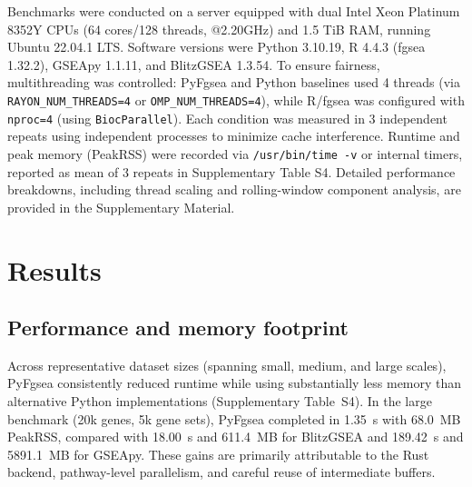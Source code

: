 \documentclass[numsec,webpdf,modern,large,numbered]{oup-authoring-template}
\newcommand{\rev}[1]{\textcolor{revisionred}{#1}}
\begin{document}
Benchmarks were conducted on a server equipped with dual Intel Xeon Platinum 8352Y CPUs (64 cores/128 threads, @2.20GHz) and 1.5 TiB RAM, running Ubuntu 22.04.1 LTS.
Software versions were Python 3.10.19, R 4.4.3 (fgsea 1.32.2), GSEApy 1.1.11, and BlitzGSEA 1.3.54.
To ensure fairness, multithreading was controlled: PyFgsea and Python baselines used 4 threads (via \texttt{RAYON\_NUM\_THREADS=4} or \texttt{OMP\_NUM\_THREADS=4}), while R/fgsea was configured with \texttt{nproc=4} (using \texttt{BiocParallel}).
Each condition was measured in 3 independent repeats using independent processes to minimize cache interference.
Runtime and peak memory (PeakRSS) were recorded via \texttt{/usr/bin/time -v} or internal timers, reported as mean of 3 repeats in Supplementary Table S4.
Detailed performance breakdowns, including thread scaling and rolling-window component analysis, are provided in the Supplementary Material.

\section{Results}
\subsection{Performance and memory footprint}
Across representative dataset sizes (spanning small, medium, and large scales), PyFgsea consistently reduced runtime while using substantially less memory than alternative Python implementations \rev{(Supplementary Table~S4)}.
{\color{revisionred}In the large benchmark (20k genes, 5k gene sets), PyFgsea completed in 1.35~s with 68.0~MB PeakRSS, compared with 18.00~s and 611.4~MB for BlitzGSEA and 189.42~s and 5891.1~MB for GSEApy.}
These gains are primarily attributable to the Rust backend, pathway-level parallelism, and careful reuse of intermediate buffers.
\end{document}
